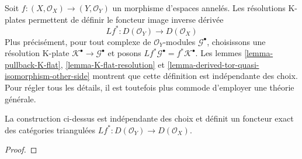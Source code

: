 {\label{section-derived-pullback}

\noindent
Soit $f : (X, \mathcal{O}_X) \to (Y, \mathcal{O}_Y)$ un morphisme d'espaces annelés. Les résolutions K-plates permettent de définir le foncteur image inverse dérivée $$
Lf^* : D(\mathcal{O}_Y) \to D(\mathcal{O}_X)
$$ Plus précisément, pour tout complexe de $\mathcal{O}_Y$-modules $\mathcal{G}^\bullet$, choisissons une résolution K-plate $\mathcal{K}^\bullet \to \mathcal{G}^\bullet$ et posons $Lf^*\mathcal{G}^\bullet = f^*\mathcal{K}^\bullet$. Les lemmes \ref{lemma-pullback-K-flat}, \ref{lemma-K-flat-resolution} et \ref{lemma-derived-tor-quasi-isomorphism-other-side} montrent que cette définition est indépendante des choix. Pour régler tous les détails, il est toutefois plus commode d'employer une théorie générale.

\begin{lemma}

\label{lemma-derived-base-change}
La construction ci-dessus est indépendante des choix et définit un foncteur exact des catégories triangulées $Lf^* : D(\mathcal{O}_Y) \to D(\mathcal{O}_X)$.
\end{lemma}

\begin{proof}


\end{proof}}
